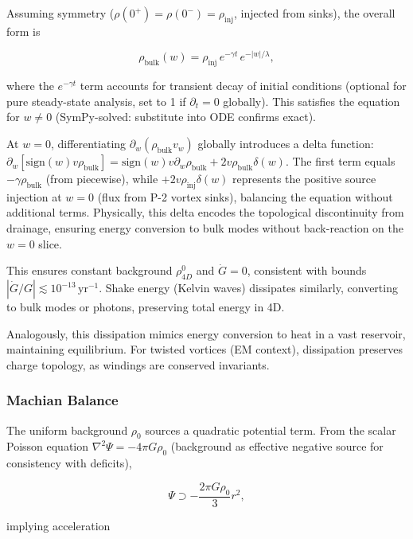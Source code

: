 Assuming symmetry ($\rho(0^+) = \rho(0^-) = \rho_{\text{inj}}$, injected from sinks), the overall form is

\begin{equation}
\rho_{\text{bulk}}(w) = \rho_{\text{inj}} \, e^{-\gamma t} \, e^{-|w| / \lambda},
\end{equation}

where the $e^{-\gamma t}$ term accounts for transient decay of initial conditions (optional for pure steady-state analysis, set to 1 if $\partial_t = 0$ globally). This satisfies the equation for $w \neq 0$ (SymPy-solved: substitute into ODE confirms exact).

At $w=0$, differentiating $\partial_w (\rho_{\text{bulk}} v_w)$ globally introduces a delta function: $\partial_w [\text{sign}(w) v \rho_{\text{bulk}}] = \text{sign}(w) v \partial_w \rho_{\text{bulk}} + 2 v \rho_{\text{bulk}} \delta(w)$. The first term equals $-\gamma \rho_{\text{bulk}}$ (from piecewise), while $+2 v \rho_{\text{inj}} \delta(w)$ represents the positive source injection at $w=0$ (flux from P-2 vortex sinks), balancing the equation without additional terms. Physically, this delta encodes the topological discontinuity from drainage, ensuring energy conversion to bulk modes without back-reaction on the $w=0$ slice.

This ensures constant background $\rho_{4D}^0$ and $\dot{G} = 0$, consistent with bounds $|\dot{G}/G| \lesssim 10^{-13} \, \mathrm{yr}^{-1}$. Shake energy (Kelvin waves) dissipates similarly, converting to bulk modes or photons, preserving total energy in 4D.

Analogously, this dissipation mimics energy conversion to heat in a vast reservoir, maintaining equilibrium. For twisted vortices (EM context), dissipation preserves charge topology, as windings are conserved invariants.

\subsubsection{Machian Balance}
The uniform background $\rho_0$ sources a quadratic potential term. From the scalar Poisson equation $\nabla^2 \Psi = -4\pi G \rho_0$ (background as effective negative source for consistency with deficits),

\begin{equation}
\Psi \supset -\frac{2\pi G \rho_0}{3} r^2,
\end{equation}

implying acceleration


